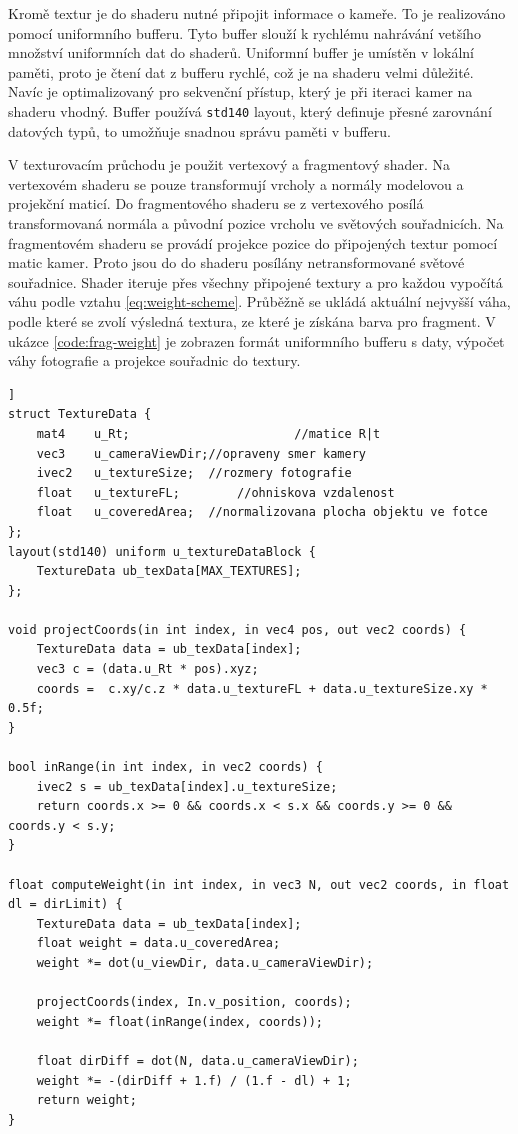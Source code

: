 \documentclass[11pt,twoside,a4paper]{book}
\begin{document}
Kromě textur je do shaderu nutné připojit informace o kameře. To je realizováno pomocí uniformního bufferu. Tyto buffer slouží k rychlému nahrávání vetšího množství uniformních dat do shaderů. Uniformní buffer je umístěn v lokální paměti, proto je čtení dat z bufferu rychlé, což je na shaderu velmi důležité. Navíc je optimalizovaný pro sekvenční přístup, který je při iteraci kamer na shaderu vhodný. Buffer používá \texttt{std140} layout, který definuje přesné zarovnání datových typů, to umožňuje snadnou správu paměti v bufferu.

V texturovacím průchodu je použit vertexový a fragmentový shader. Na vertexovém shaderu se pouze transformují vrcholy a normály modelovou a projekční maticí. Do fragmentového shaderu se z vertexového posílá transformovaná normála a původní pozice vrcholu ve světových souřadnicích. Na fragmentovém shaderu se provádí projekce pozice do připojených textur pomocí matic kamer. Proto jsou do do shaderu posílány netransformované  světové souřadnice. Shader iteruje přes všechny připojené textury a pro každou vypočítá váhu podle vztahu \ref{eq:weight-scheme}.  Průběžně se ukládá aktuální nejvyšší váha, podle které se zvolí výsledná textura, ze které je získána barva pro fragment. V ukázce \ref{code:frag-weight} je zobrazen formát uniformního bufferu s daty, výpočet váhy fotografie a projekce souřadnic do textury.

\begin{lstlisting}[caption={Výpočet váhy a projekce souřadnice na fragmentovém shaderu.},label={code:frag-weight},float=[ht]]
struct TextureData {
	mat4	u_Rt;						//matice R|t
	vec3	u_cameraViewDir;//opraveny smer kamery
	ivec2	u_textureSize;	//rozmery fotografie
	float	u_textureFL;		//ohniskova vzdalenost
	float	u_coveredArea;	//normalizovana plocha objektu ve fotce
};
layout(std140) uniform u_textureDataBlock {
	TextureData ub_texData[MAX_TEXTURES];
};

void projectCoords(in int index, in vec4 pos, out vec2 coords) {
	TextureData data = ub_texData[index];
	vec3 c = (data.u_Rt * pos).xyz;
	coords =  c.xy/c.z * data.u_textureFL + data.u_textureSize.xy * 0.5f;
}

bool inRange(in int index, in vec2 coords) {
	ivec2 s = ub_texData[index].u_textureSize;
	return coords.x >= 0 && coords.x < s.x && coords.y >= 0 && coords.y < s.y; 
}

float computeWeight(in int index, in vec3 N, out vec2 coords, in float dl = dirLimit) {
	TextureData data = ub_texData[index];
	float weight = data.u_coveredArea;
	weight *= dot(u_viewDir, data.u_cameraViewDir);

	projectCoords(index, In.v_position, coords);
	weight *= float(inRange(index, coords));

	float dirDiff = dot(N, data.u_cameraViewDir);
	weight *= -(dirDiff + 1.f) / (1.f - dl) + 1;
	return weight;
}
\end{lstlisting}
\end{document}
